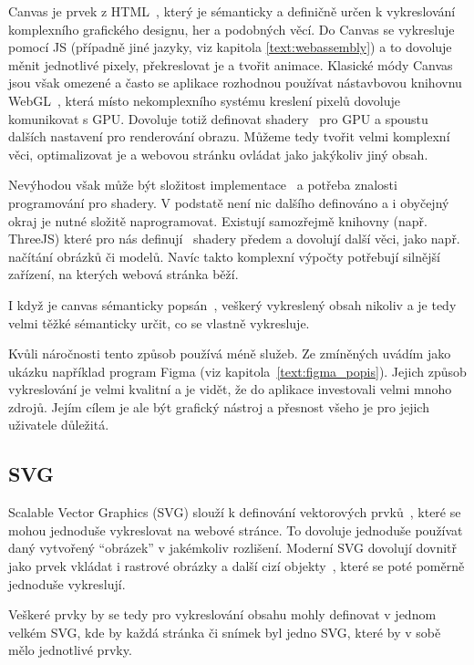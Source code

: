 Canvas je prvek z HTML~\cite{canvashtml5, uzayr2022frontend}, který je sémanticky a definičně určen k vykreslování komplexního grafického designu, her a podobných věcí.
Do Canvas se vykresluje pomocí JS (případně jiné jazyky, viz kapitola \ref{text:webassembly}) a to dovoluje měnit jednotlivé pixely, překreslovat je a tvořit animace.
Klasické módy Canvas jsou však omezené a často se aplikace rozhodnou používat nástavbovou knihovnu WebGL~\cite{canvashtml5}, která místo nekomplexního systému kreslení pixelů dovoluje komunikovat s GPU.
Dovoluje totiž definovat shadery~\cite{canvashtml5} pro GPU a spoustu dalších nastavení pro renderování obrazu.
Můžeme tedy tvořit velmi komplexní věci, optimalizovat je a webovou stránku ovládat jako jakýkoliv jiný obsah. 

Nevýhodou však může být složitost implementace~\cite{canvashtml5} a potřeba znalosti programování pro shadery.
V podstatě není nic dalšího definováno a i obyčejný okraj je nutné složitě naprogramovat.
Existují samozřejmě knihovny (např. ThreeJS) které pro nás definují~\cite{canvashtml5} shadery předem a dovolují další věci, jako např. načítání obrázků či modelů.
Navíc takto komplexní výpočty potřebují silnější zařízení, na kterých webová stránka běží.

I když je canvas sémanticky popsán~\cite{canvashtml5}, veškerý vykreslený obsah nikoliv a je tedy velmi těžké sémanticky určit, co se vlastně vykresluje.

Kvůli náročnosti tento způsob používá méně služeb. Ze zmíněných uvádím jako ukázku například program Figma (viz kapitola~\ref{text:figma_popis}).
Jejich způsob vykreslování je velmi kvalitní a je vidět, že do aplikace investovali velmi mnoho zdrojů.
Jejím cílem je ale být grafický nástroj a přesnost všeho je pro jejich uživatele důležitá.

\subsection{SVG}

Scalable Vector Graphics (SVG) slouží k definování vektorových prvků~\cite{svg_css_html}, které se mohou jednoduše vykreslovat na webové stránce.
To dovoluje jednoduše používat daný vytvořený \enquote{obrázek} v jakémkoliv rozlišení.
Moderní SVG dovolují dovnitř jako prvek vkládat i rastrové obrázky a další cizí objekty~\cite{svg_css_html, uzayr2022frontend}, které se poté poměrně jednoduše vykreslují.

Veškeré prvky by se tedy pro vykreslování obsahu mohly definovat v jednom velkém SVG, kde by každá stránka či snímek byl jedno SVG, které by v sobě mělo jednotlivé prvky.

